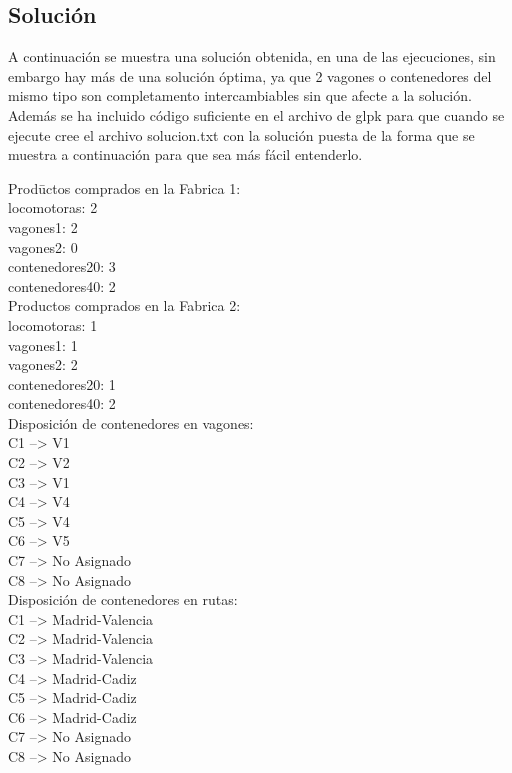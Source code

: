 \documentclass[11pt,spanish]{article}
\begin{document}
		\subsection{Solución}
		A continuación se muestra una solución obtenida, en una de las ejecuciones, sin embargo hay más de una solución óptima, ya que 2 vagones o contenedores del mismo tipo son completamento intercambiables sin que afecte a la solución. Además se ha incluido código suficiente en el archivo de glpk para que cuando se ejecute cree el archivo solucion.txt con la solución puesta de la forma que se muestra a continuación para que sea más fácil entenderlo.
		\begin{tabbing}
		Prod\=uctos comprados en la Fabrica 1:\\
		\>	locomotoras: 2\\
		\>	vagones1: 2\\
		\>	vagones2: 0\\
		\>	contenedores20: 3\\
		\>	contenedores40: 2\\
		Productos comprados en la Fabrica 2:\\
		\>	locomotoras: 1\\
		\>	vagones1: 1\\
		\>	vagones2: 2\\
		\>	contenedores20: 1\\
		\>	contenedores40: 2\\
		Disposición de contenedores en vagones:\\
		\>	C1 --> V1\\
		\>	C2 --> V2\\
		\>	C3 --> V1\\
		\>	C4 --> V4\\
		\>	C5 --> V4\\
		\>	C6 --> V5\\
		\>	C7 --> No Asignado\\
		\>	C8 --> No Asignado\\
		Disposición de contenedores en rutas:\\
		\>	C1 --> Madrid-Valencia\\
		\>	C2 --> Madrid-Valencia\\
		\>	C3 --> Madrid-Valencia\\
		\>	C4 --> Madrid-Cadiz\\
		\>	C5 --> Madrid-Cadiz\\
		\>	C6 --> Madrid-Cadiz\\
		\>	C7 --> No Asignado\\
		\>	C8 --> No Asignado\\

\end{tabbing}
\end{document}
